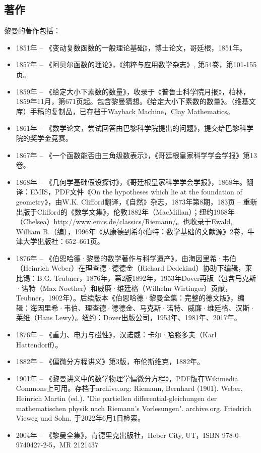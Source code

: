 \subsection{著作}
黎曼的著作包括：
\begin{itemize}
\item 1851年 – 《变动复数函数的一般理论基础》，博士论文，哥廷根，1851年。
\item 1857年 – 《阿贝尔函数的理论》，《纯粹与应用数学杂志》, 第54卷，第101-155页。
\item 1859年 – 《给定大小下素数的数量》，收录于《普鲁士科学院月报》，柏林，1859年11月，第671页起。包含黎曼猜想。《给定大小下素数的数量》。（维基文库）手稿的复制品，已存档于Wayback Machine，Clay Mathematics。
\item 1861年 – 《数学论文，尝试回答由巴黎科学院提出的问题》，提交给巴黎科学院的奖学金竞赛。
\item 1867年 – 《一个函数能否由三角级数表示》，《哥廷根皇家科学学会学报》第13卷。
\item 1868年 – 《几何学基础假设探讨》，《哥廷根皇家科学学会学报》，1868年。翻译：EMIS，PDF文件《On the hypotheses which lie at the foundation of geometry》，由W.K. Clifford翻译，《自然》杂志，1873年第8期，183页 – 重新出版于Clifford的《数学文集》，伦敦1882年（MacMillan）；纽约1968年（Chelsea）http://www.emis.de/classics/Riemann/。也收录于Ewald, William B.（编），1996年《从康德到希尔伯特：数学基础的文献源》2卷，牛津大学出版社：652–661页。
\item 1876年 – 《伯恩哈德·黎曼的数学著作与科学遗产》，由海因里希·韦伯（Heinrich Weber）在理查德·德德金（Richard Dedekind）协助下编辑，莱比锡：B.G. Teubner，1876年，第2版1892年，1953年Dover再版（包含马克斯·诺特（Max Noether）和威廉·维廷格（Wilhelm Wirtinger）贡献，Teubner，1902年）。后续版本《伯恩哈德·黎曼全集：完整的德文版》，编辑：海因里希·韦伯、理查德·德德金、马克斯·诺特、威廉·维廷格、汉斯·莱维（Hans Lewy）。纽约：Dover出版公司，1953年、1981年、2017年。
\item 1876年 – 《重力、电力与磁性》，汉诺威：卡尔·哈滕多夫（Karl Hattendorff）。
\item 1882年 – 《偏微分方程讲义》第3版，布伦斯维克，1882年。
\item 1901年 – 《黎曼讲义中的数学物理学偏微分方程》，PDF版在Wikimedia Commons上可用。存档于archive.org: Riemann, Bernhard (1901). Weber, Heinrich Martin (ed.). "Die partiellen differential-gleichungen der mathematischen physik nach Riemann's Vorlesungen". archive.org. Friedrich Vieweg und Sohn. 于2022年6月1日检索。
\item 2004年 – 《黎曼全集》，肯德里克出版社，Heber City, UT，ISBN 978-0-9740427-2-5，MR 2121437
\end{itemize}

